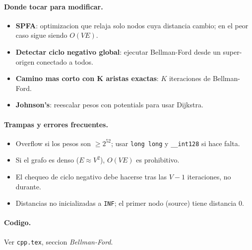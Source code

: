 \paragraph{Donde tocar para modificar.}
\begin{itemize}\setlength\itemsep{0pt}
	\item \textbf{SPFA}: optimizacion que relaja solo nodos cuya distancia cambio; en el peor caso sigue siendo $O(VE)$.
	\item \textbf{Detectar ciclo negativo global}: ejecutar Bellman-Ford desde un super-origen conectado a todos.
	\item \textbf{Camino mas corto con K aristas exactas}: $K$ iteraciones de Bellman-Ford.
	\item \textbf{Johnson's}: reescalar pesos con potentials para usar Dijkstra.
\end{itemize}

\paragraph{Trampas y errores frecuentes.}
\begin{itemize}\setlength\itemsep{0pt}
	\item Overflow si los pesos son $\ge 2^{52}$; usar \texttt{long long} y \texttt{\_\_int128} si hace falta.
	\item Si el grafo es denso ($E \approx V^2$), $O(VE)$ es prohibitivo.
	\item El chequeo de ciclo negativo debe hacerse tras las $V - 1$ iteraciones, no durante.
	\item Distancias no inicializadas a \texttt{INF}; el primer nodo (source) tiene distancia 0.
\end{itemize}

\paragraph{Codigo.}
Ver \texttt{cpp.tex}, seccion \textit{Bellman-Ford}.

\vspace{0.5em}
